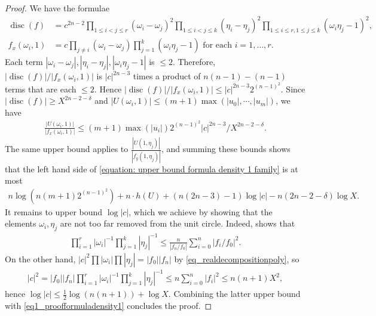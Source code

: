 \documentclass{article} %
\numberwithin{equation}{section}
\DeclareMathOperator{\disc}{disc}
\begin{document}
\begin{proof}
    We have the formulae 
    \begin{align*}
        \disc(f) &= c^{2n-2} \prod_{1\leq i<j\leq r} (\omega_i-\omega_j)^2 \prod_{1\leq i<j\leq k}(\eta_i-\eta_j)^2 \prod_{1 \leq i \leq r, 1\leq j\leq k} (\omega_i\eta_j-1)^2 , \\
        f_x(\omega_i,1) &= c\prod_{j\neq i}(\omega_i -\omega_j) \prod_{j=1}^k(\omega_i\eta_j-1) \text{ for each }i=1,\dots,r.
    \end{align*}
    Each term $|\omega_i-\omega_j|, |\eta_i-\eta_j|, |\omega_i\eta_j-1|$ is $\leq 2$. 
    Therefore, $|\disc(f)|/|f_x(\omega_i,1)|$ is $|c|^{2n-3}$ times a product of $n(n-1)-(n-1)$ terms that are each $\leq 2$.
    Hence $|\disc(f)|/|f_x(\omega_i,1)|\leq |c|^{2n-3} 2^{(n-1)^2}$.
    Since $|\disc(f)|\geq X^{2n-2-\delta}$ and $|U(\omega_i,1)|\leq (m+1) \max(|u_0|, \cdots, |u_m|)$, we have 
    \begin{align*}
        \frac{|U(\omega_i,1)|}{|f_x(\omega_i,1)|}\leq (m+1) \max(|u_i|) 2^{(n-1)^2} |c|^{2n-3}/X^{2n-2-\delta}.
    \end{align*}
    The same upper bound applies to $\frac{|U(1,\eta_j)|}{|f_y(1,\eta_j)|}$, and summing these bounds shows that the left hand side of \eqref{equation: upper bound formula density 1 family} is at most
    \begin{align}\label{eq1_proofformuladensity1}
        n\log(n(m+1)2^{(n-1)^2}) + n\cdot h(U) + (n(2n-3)-1)\log |c| - n(2n-2-\delta)\log X.
    \end{align}
    It remains to upper bound $\log |c|$, which we achieve by showing that the elements $\omega_i,\eta_j$ are not too far removed from the unit circle.
    Indeed, \cite[Theorem 1]{soundararajan-equidistributionzeroespolys} shows that 
    \begin{align*}
        \prod_{i=1}^r |\omega_i|^{-1} \prod_{j=1}^k |\eta_j|^{-1} \leq \frac{n}{|f_n/f_0|} \sum_{i=0}^n |f_i/f_0|^2.
    \end{align*}
    On the other hand, $|c|^2 \prod |\omega_i| \prod |\eta_j| = |f_0||f_n|$ by \eqref{eq_realdecompositionpoly}, so 
    \begin{align*}
        |c|^2 = |f_0||f_n|\prod_{i=1}^r |\omega_i|^{-1} \prod_{j=1}^k |\eta_j|^{-1} \leq n \sum_{i=0}^n |f_i|^2 \leq n(n+1) X^{2},
    \end{align*}
    hence $\log|c|\leq \frac{1}{2} \log(n(n+1)) + \log X$.
    Combining the latter upper bound with \eqref{eq1_proofformuladensity1} concludes the proof.
\end{proof}
\end{document}
